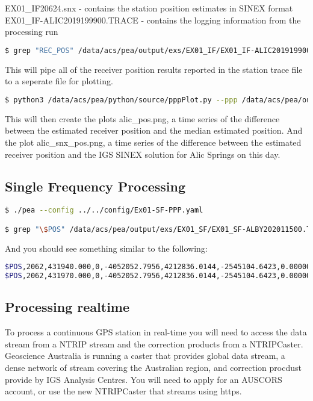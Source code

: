 EX01\_IF20624.snx              - contains the station position estimates in SINEX format
EX01\_IF-ALIC2019199900.TRACE  - contains the logging information from the processing run

\begin{lstlisting}[language=bash]
$ grep "REC_POS" /data/acs/pea/output/exs/EX01_IF/EX01_IF-ALIC201919900.TRACE > ALIC_201919900.PPP
\end{lstlisting}
This will pipe all of the receiver position results reported in the station trace file to a seperate file for plotting.
\begin{lstlisting}[language=bash]
$ python3 /data/acs/pea/python/source/pppPlot.py --ppp /data/acs/pea/output/exs/EX01_IF/ALIC_201919900.PPP
\end{lstlisting}
This will then create the plots alic\_pos.png, a time series of the difference between the estimated receiver position and the median estimated position.
And the plot alic\_snx\_pos.png, a time series of the difference between the estimated receiver position and the IGS SINEX solution for Alic Springs on this day.

\subsection{Single Frequency Processing} 
\begin{lstlisting}[language=bash]
$ ./pea --config ../../config/Ex01-SF-PPP.yaml

$ grep "\$POS" /data/acs/pea/output/exs/EX01_SF/EX01_SF-ALBY202011500.TRACE
\end{lstlisting}
And you should see something similar to the following:
\begin{lstlisting}[language=bash]
$POS,2062,431940.000,0,-4052052.7956,4212836.0144,-2545104.6423,0.00000043966020,...
$POS,2062,431970.000,0,-4052052.7956,4212836.0144,-2545104.6423,0.00000043965772,...
\end{lstlisting}



\subsection{Processing realtime}
To process a continuous GPS station in real-time you will need to access the data stream from a NTRIP stream and the correction products from a NTRIPCaster.
Geoscience Australia is running a caster that provides global data stream, a dense network of stream covering the Australian region, and correction procdust provide by IGS Analysis Centres.
You will need to apply for an AUSCORS account, or use the new NTRIPCaster that streams using https.

